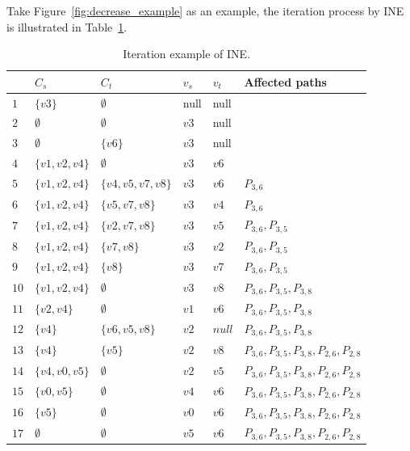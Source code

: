 Take Figure~\ref{fig:decrease_example} as an example, the iteration process by INE is illustrated in Table~\ref{tab:algo3}.
\begin{table}[htbp]
	\centering
	\caption{Iteration example of INE.}
	\begin{tabular}{|l|l|l|l|l|l|}
    \hline
     & $C_s$ & $C_t$ & $v_s$ & $v_t$ & Affected paths \\
    \hline
    $1$ & $\{v3\}$ 		  & $\emptyset$ 	  & null & null &  \\
    $2$ & $\emptyset$	  & $\emptyset$       & $v3$ & null &  \\
    $3$ & $\emptyset$  & $\{v6\}$          & $v3$ & null &  \\
	$4$ & $\{v1,v2,v4\}$  & $\emptyset$ 	  & $v3$ & $v6$ &  \\
    $5$ & $\{v1,v2,v4\}$  & $\{v4,v5,v7,v8\}$ & $v3$ & $v6$ & $P_{3,6}$ \\
    $6$ & $\{v1,v2,v4\}$  & $\{v5,v7,v8\}$    & $v3$ & $v4$ & $P_{3,6}$ \\
    $7$ & $\{v1,v2,v4\}$  & $\{v2,v7,v8\}$ 	  & $v3$ & $v5$ & $P_{3,6},P_{3,5}$ \\
    $8$ & $\{v1,v2,v4\}$  & $\{v7,v8\}$ 	  & $v3$ & $v2$ & $P_{3,6},P_{3,5}$ \\
    $9$ & $\{v1,v2,v4\}$ & $\{v8\}$ 		  & $v3$ & $v7$ & $P_{3,6},P_{3,5}$ \\
    $10$ & $\{v1,v2,v4\}$ & $\emptyset$ 	  & $v3$ & $v8$ & $P_{3,6},P_{3,5},P_{3,8}$ \\
    $11$ & $\{v2,v4\}$ 	  & $\emptyset$ 	  & $v1$ & $v6$ & $P_{3,6},P_{3,5},P_{3,8}$ \\
    $12$ & $\{v4\}$		  & $\{v6,v5,v8\}$ 	      & $v2$ & $null$ & $P_{3,6},P_{3,5},P_{3,8}$ \\
    $13$ & $\{v4\}$		  & $\{v5\}$ 	  & $v2$ & $v8$ & $P_{3,6},P_{3,5},P_{3,8},P_{2,6},P_{2,8}$ \\
    $14$ & $\{v4,v0,v5\}$		  & $\emptyset$ 	  & $v2$ & $v5$ & $P_{3,6},P_{3,5},P_{3,8},P_{2,6},P_{2,8}$ \\
    $15$ & $\{v0,v5\}$ 	  & $\emptyset$ 	  & $v4$ & $v6$ & $P_{3,6},P_{3,5},P_{3,8},P_{2,6},P_{2,8}$  \\
     $16$ & $\{v5\}$ 	  & $\emptyset$ 	  & $v0$ & $v6$ & $P_{3,6},P_{3,5},P_{3,8},P_{2,6},P_{2,8}$  \\
    $17$ & $\emptyset$ 	  & $\emptyset$ 	  & $v5$ & $v6$ & $P_{3,6},P_{3,5},P_{3,8},P_{2,6},P_{2,8}$  \\
    \hline
    \end{tabular}
    \label{tab:algo3}
\end{table}

